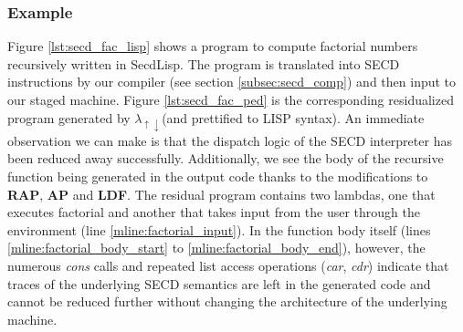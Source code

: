 \documentclass[a4paper,12pt,twoside,openright]{report}
\theoremstyle{definition}
\newcommand{\mslang}{$\lambda_{\uparrow\downarrow}$}
\newcommand{\secdlisp}{SecdLisp}
\begin{document}
\newpage
\subsubsection{Example}
Figure \ref{lst:secd_fac_lisp} shows a program to compute factorial numbers recursively written in \secdlisp. The program is translated into SECD instructions by our compiler (see section \ref{subsec:secd_comp}) and then input to our staged machine. Figure \ref{lst:secd_fac_ped} is the corresponding residualized program generated by \mslang (and prettified to LISP syntax). An immediate observation we can make is that the dispatch logic of the SECD interpreter has been reduced away successfully. Additionally, we see the body of the recursive function being generated in the output code thanks to the modifications to \textbf{RAP}, \textbf{AP} and \textbf{LDF}. The residual program contains two lambdas, one that executes factorial and another that takes input from the user through the environment (line \ref{mline:factorial_input}). In the function body itself (lines \ref{mline:factorial_body_start} to \ref{mline:factorial_body_end}), however, the numerous \textit{cons} calls and repeated list access operations (\textit{car}, \textit{cdr}) indicate that traces of the underlying SECD semantics are left in the generated code and cannot be reduced further without changing the architecture of the underlying machine.
\end{document}
